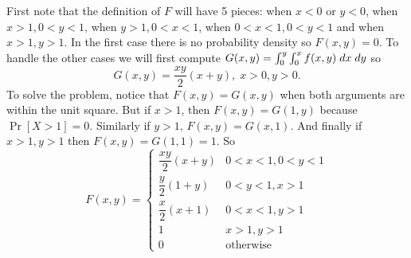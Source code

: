\documentclass[../main.tex]{subfiles}
\begin{document}
\begin{solution}
First note that the definition of $F$ will have 5 pieces: when $x<0$ or $y<0$, when $x>1,0<y<1$,
when $y>1, 0<x<1$, when $0<x<1, 0<y<1$ and when $x>1,y>1$. In the first case there is no probability density so $F(x,y) = 0$. To handle the other cases we will first compute $G(x,y)
 = \int_0^y\int_0^x f(x,y) \;dx \;dy$ so
 $$G(x,y) = \dfrac{xy}{2}(x+y), \; x>0, y>0.$$
 To solve the problem, notice that $F(x,y) = G(x,y)$ when both arguments are within the unit square. But if $x>1$, then $F(x,y) = G(1,y)$ because $\Pr[X>1] = 0$. Similarly if $y>1$,
 $F(x,y) = G(x,1)$. And finally if $x>1,y>1$ then $F(x,y) = G(1,1) = 1$. So
 $$F(x,y) = 
    \begin{cases}
        \dfrac{xy}{2}(x+y) & 0<x<1, 0<y<1 \\[4ex]
        \dfrac{y}{2}(1+y) & 0<y<1, x>1 \\[4ex]
        \dfrac{x}{2}(x+1) & 0<x<1, y>1 \\[4ex]
        1 & x>1, y>1 \\
        0 & \mbox {otherwise}
    \end{cases}$$
\end{solution}
\end{document}
